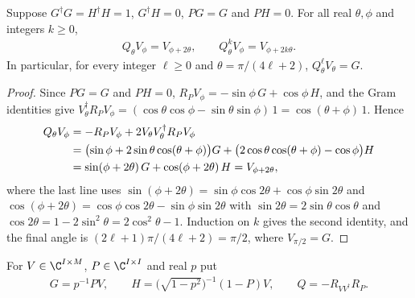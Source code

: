 \begin{theorem}
    \label{thm:gate_subspace_amplification}
    \leanok
    Suppose $G^\dagger G=H^\dagger H=1$, $G^\dagger H=0$, $PG=G$ and $PH=0$.
    For all real $\theta,\phi$ and integers $k\geq0$,
    \begin{align}
        Q_\theta V_\phi=V_{\phi+2\theta},
        \qquad Q_\theta^k V_\phi=V_{\phi+2k\theta}.
    \end{align}
    In particular, for every integer $\ell\geq0$ and
    $\theta=\pi/(4\ell+2)$, $Q_\theta^\ell V_\theta=G$.
\end{theorem}
\begin{proof}\leanok
    Since $PG=G$ and $PH=0$, $R_PV_\phi=-\sin\phi\,G+\cos\phi\,H$, and the
    Gram identities give
    $V_\theta^\dagger R_PV_\phi
    =(\cos\theta\cos\phi-\sin\theta\sin\phi)\,1=\cos(\theta+\phi)\,1$.
    Hence
    \begin{align}
        Q_\theta V_\phi
         & =-R_PV_\phi+2V_\theta V_\theta^\dagger R_PV_\phi \notag                \\
         & =\bigl(\sin\phi+2\sin\theta\cos(\theta+\phi)\bigr)G
        +\bigl(2\cos\theta\cos(\theta+\phi)-\cos\phi\bigr)H \notag             \\
         & =\sin(\phi+2\theta)\,G+\cos(\phi+2\theta)\,H=V_{\phi+2\theta},
    \end{align}
    where the last line uses
    $\sin(\phi+2\theta)=\sin\phi\cos2\theta+\cos\phi\sin2\theta$ and
    $\cos(\phi+2\theta)=\cos\phi\cos2\theta-\sin\phi\sin2\theta$ with
    $\sin2\theta=2\sin\theta\cos\theta$ and
    $\cos2\theta=1-2\sin^2\theta=2\cos^2\theta-1$. Induction on $k$ gives
    the second identity, and the final angle is
    $(2\ell+1)\pi/(4\ell+2)=\pi/2$, where $V_{\pi/2}=G$.
\end{proof}

\begin{definition}
    \label{def:gate_uniform_postselection}
    \leanok
    For $V\in\C^{I\times M}$, $P\in\C^{I\times I}$ and real $p$ put
    \begin{align}
        G=p^{-1}PV,\qquad H=\bigl(\sqrt{1-p^2}\bigr)^{-1}(1-P)V,
        \qquad Q=-R_{VV^\dagger}R_P.
    \end{align}
\end{definition}

